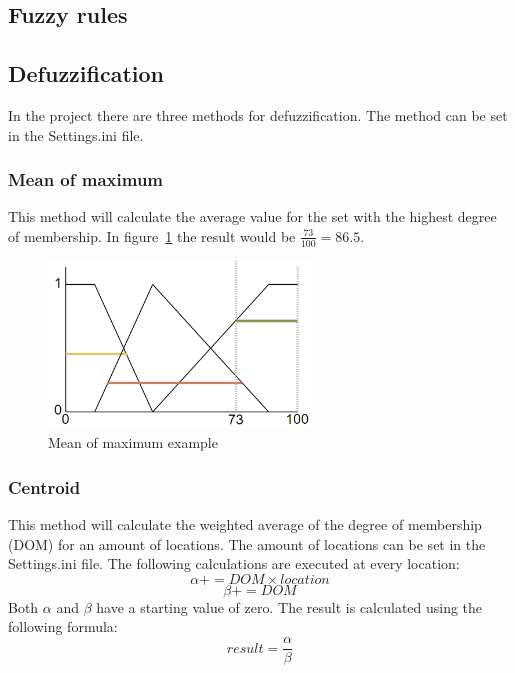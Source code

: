 \documentclass{article}
\begin{document}
   \subsection{Fuzzy rules}
   
   \subsection{Defuzzification}
   In the project there are three methods for defuzzification. The method can be set in the Settings.ini file.
   
   \subsubsection {Mean of maximum}  
   This method will calculate the average value for the set with the highest degree of membership. In figure~\ref{fig:MOM} the result would be \(\frac{73}{100}=86.5\). 
   \begin{figure}[h!]
   \begin{center}
   \includegraphics[width=7cm]{MOM.png}
   \end{center}
   \caption{Mean of maximum example}
   \label{fig:MOM}
   \end{figure}
   \subsubsection {Centroid}  
   This method will calculate the weighted average of the degree of membership (DOM) for an amount of locations. The amount of locations can be set in the Settings.ini file. The following calculations are executed at every location:
   \[ \alpha += DOM \times location \]
   \[ \beta += DOM \]
   Both \(\alpha\) and \(\beta\) have a starting value of zero.
   The result is calculated using the following formula:
   \[ result = \frac{\alpha}{\beta} \]
   
\end{document}
